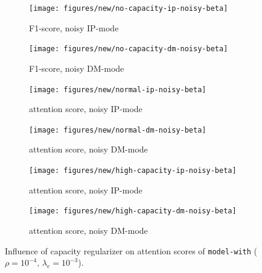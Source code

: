 \begin{figure}[!h]
\centering
\begin{subfigure}{.5\textwidth}
  \centering
  \texttt{[image: figures/new/no-capacity-ip-noisy-beta]}
  \caption{F1-score, noisy IP-mode}
  \label{fig:exp-9-a}
\end{subfigure}%
\begin{subfigure}{.5\textwidth}
  \centering
  \texttt{[image: figures/new/no-capacity-dm-noisy-beta]}
  \caption{F1-score, noisy DM-mode}
 \label{fig:exp-9-b} 
\end{subfigure}
\begin{subfigure}{.5\textwidth}
  \centering
  \texttt{[image: figures/new/normal-ip-noisy-beta]}
  \caption{attention score, noisy IP-mode}
   \label{fig:exp-9-c} 
\end{subfigure}%
\begin{subfigure}{.5\textwidth}
  \centering
  \texttt{[image: figures/new/normal-dm-noisy-beta]}
  \caption{attention score, noisy DM-mode}
   \label{fig:exp-9-d} 
\end{subfigure}
\begin{subfigure}{.5\textwidth}
  \centering
  \texttt{[image: figures/new/high-capacity-ip-noisy-beta]}
  \caption{attention score, noisy IP-mode}
   \label{fig:exp-9-e} 
\end{subfigure}%
\begin{subfigure}{.5\textwidth}
  \centering
  \texttt{[image: figures/new/high-capacity-dm-noisy-beta]}
  \caption{attention score, noisy DM-mode}
   \label{fig:exp-9-f} 
\end{subfigure}
\caption[Robustness generalisation]{Influence of capacity regularizer on attention scores of \texttt{model-with} ($\rho=10^{-4},\,\lambda_e=10^{-3}$).}
\label{fig:exp-9}
\end{figure}

